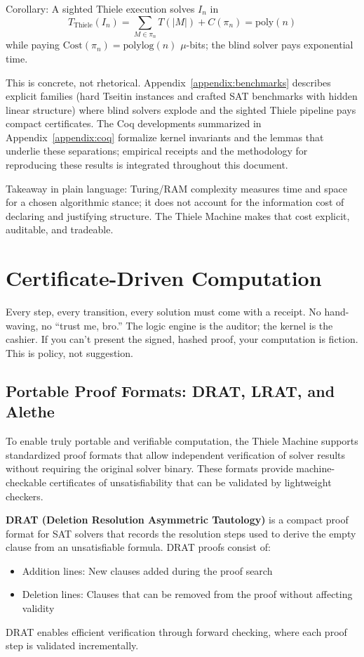 \documentclass[11pt]{article}
\begin{document}
Corollary: A sighted Thiele execution solves $I_n$ in
\[
T_{\mathrm{Thiele}}(I_n)=\sum_{M\in\pi_n}T(|M|)+C(\pi_n)=\mathrm{poly}(n)
\]
while paying $\mathrm{Cost}(\pi_n)=\mathrm{polylog}(n)$ $\mu$-bits; the blind solver pays exponential time.

This is concrete, not rhetorical. Appendix~\ref{appendix:benchmarks} describes explicit families (hard Tseitin instances and crafted SAT benchmarks with hidden linear structure) where blind solvers explode and the sighted Thiele pipeline pays compact certificates. The Coq developments summarized in Appendix~\ref{appendix:coq} formalize kernel invariants and the lemmas that underlie these separations; empirical receipts and the methodology for reproducing these results is integrated throughout this document.

Takeaway in plain language: Turing/RAM complexity measures time and space for a chosen algorithmic stance; it does not account for the information cost of declaring and justifying structure. The Thiele Machine makes that cost explicit, auditable, and tradeable.

\section{Certificate-Driven Computation}
Every step, every transition, every solution must come with a receipt. No hand-waving, no “trust me, bro.” The logic engine is the auditor; the kernel is the cashier. If you can’t present the signed, hashed proof, your computation is fiction. This is policy, not suggestion.

\subsection{Portable Proof Formats: DRAT, LRAT, and Alethe}
To enable truly portable and verifiable computation, the Thiele Machine supports standardized proof formats that allow independent verification of solver results without requiring the original solver binary. These formats provide machine-checkable certificates of unsatisfiability that can be validated by lightweight checkers.

\textbf{DRAT (Deletion Resolution Asymmetric Tautology)} is a compact proof format for SAT solvers that records the resolution steps used to derive the empty clause from an unsatisfiable formula. DRAT proofs consist of:
\begin{itemize}
  \item Addition lines: New clauses added during the proof search
  \item Deletion lines: Clauses that can be removed from the proof without affecting validity
\end{itemize}
DRAT enables efficient verification through forward checking, where each proof step is validated incrementally.
\end{document}
